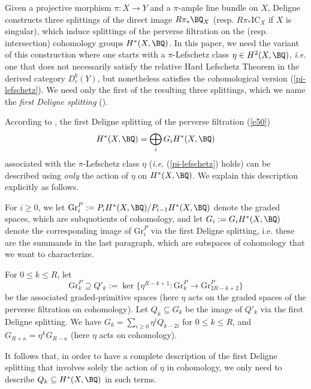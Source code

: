 Given a projective morphism $\pi : X \to Y$ and a $\pi$-ample line bundle  on $X$, Deligne \cite{D}
constructs three splittings of the direct image $R\pi_* \BQ_X$ (resp. $R\pi_* \mathrm{IC}_X$ if $X$ is singular), which induce splittings of the perverse filtration on the (resp. intersection) cohomology groups $H^*(X,\BQ)$. In this paper, we need the variant \cite{dC} of this construction
where one starts with a $\pi$-Lefschetz class $\eta \in H^2(X,\BQ)$, \emph{i.e.} one that does not necessarily satisfy the relative Hard Lefschetz Theorem in the derived category $D^b_c(Y)$, but nonetheless satisfies the cohomological version (\ref{pi-lefschetz}).
We need only the first of the resulting three splittings, which we name the \emph{first Deligne splitting}
(\cite{D,dCM4,dC}).




According to \cite{dC}, the first Deligne splitting of the perverse filtration (\ref{e50})
\[
H^*(X,\BQ) = \bigoplus_{i}G_iH^*(X, \BQ)
\]
 associated with the $\pi$-Lefschetz class $\eta$ (\emph{i.e.} (\ref{pi-lefschetz}) holds)
can be described using \emph{only} the action of $\eta$ on $H^*(X,\BQ)$.  We explain this description explicitly as follows.

For $i  \geq 0$, we let $\mathrm{Gr}^P_i:=P_iH^*(X,\BQ)/P_{i-1}H^*(X,\BQ)$ denote the graded spaces, which are subquotients of cohomology, and let $G_i:= G_i H^*(X,\BQ)$ denote the corresponding image of $\mathrm{Gr}^P_i$ via the first Deligne splitting, i.e. these are the summands in the last paragraph, which are subspaces of cohomology that we want to characterize.


For $0 \leq k \leq {R}$, let
\[
\mathrm{Gr}^P_k\supseteq Q'_k:=
\ker \{\eta^{{R}-k+1}: \mathrm{Gr}^P_{k}\to \mathrm{Gr}^P_{2{R} -k +2}\}
\]
be the associated graded-primitive spaces (here $\eta$ acts on the graded spaces of the perverse filtration on cohomology).
Let $Q_k \subseteq G_k$ be the image of $Q'_k$ via the first Deligne splitting. We have
$G_k= \sum_{i \geq 0} \eta^i Q_{k-2i}$ for $0 \leq k \leq {R}$, and $G_{{R}+\kappa}=\eta^k G_{{R}-\kappa}$
(here $\eta$ acts on cohomology).

It follows that, in order to have a complete description of the first Deligne splitting that involves solely
the action of $\eta$ in cohomology, we only need to describe $Q_k \subseteq H^*(X,\BQ)$ in such terms.

